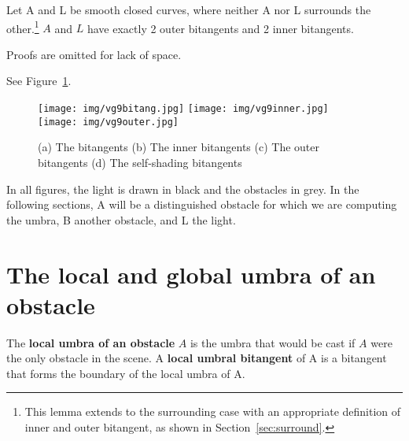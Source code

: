 \documentclass[9pt]{article}
\newif\ifJournal
\begin{document}
\begin{lemma}
Let A and L be smooth closed curves, where neither A nor L surrounds the
other.\footnote{This lemma extends to the surrounding case with an
	appropriate definition of inner and outer bitangent, as shown in
	Section~\ref{sec:surround}.}
$A$ and $L$ have exactly 2 outer bitangents and 2 inner bitangents.
\end{lemma}
\ifJournal
\prf
This lemma relies on the fact that the inner and outer tangents are extremal.
There is an alternative definition of inner and outer bitangents
that has a more intuitive appeal: the inner and outer bitangents of A and B
are the only bitangents of the convex hull of A and the convex hull of B.
That is, compute the convex hull of A and the convex hull of B, then take
bitangents: there are only 4 bitangents (proof?) and these are the inner and
outer bitangents of A and B.
\QED
\else
\prf
Proofs are omitted for lack of space.
\QED
\fi

See Figure~\ref{fig:inout}.

\begin{figure}[h]
\begin{center}
\texttt{[image: img/vg9bitang.jpg]}
\texttt{[image: img/vg9inner.jpg]}
\texttt{[image: img/vg9outer.jpg]}
\end{center}
\caption{(a) The bitangents
	 (b) The inner bitangents 
	 (c) The outer bitangents
	 (d) The self-shading bitangents}
\label{fig:inout}
\end{figure}

In all figures, the light is drawn in black and the obstacles in grey.
In the following sections, A will be a distinguished obstacle for which
we are computing the umbra, B another obstacle, and L the light.



\section{The local and global umbra of an obstacle}
\label{sec:localumbra}

\begin{defn2}
The {\bf local umbra of an obstacle} $A$ is the umbra that would be
cast if $A$ were the only obstacle in the scene.
A {\bf local umbral bitangent} of A is a bitangent 
that forms the boundary of the local umbra of A.
\end{defn2}
\end{document}
